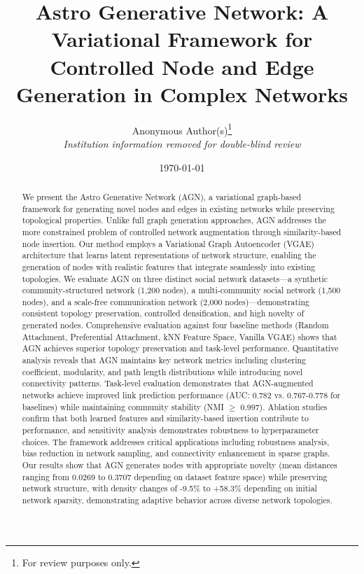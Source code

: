 \documentclass[12pt]{article}
\title{Astro Generative Network: A Variational Framework for Controlled Node and Edge Generation in Complex Networks}
\author{Anonymous Author(s)\thanks{For review purposes only.} \\
        \textit{Institution information removed for double-blind review}}
\date{\today}
\begin{document}
\maketitle

\begin{abstract}
We present the Astro Generative Network (AGN), a variational graph-based framework for generating novel nodes and edges in existing networks while preserving topological properties. Unlike full graph generation approaches, AGN addresses the more constrained problem of controlled network augmentation through similarity-based node insertion. Our method employs a Variational Graph Autoencoder (VGAE) architecture that learns latent representations of network structure, enabling the generation of nodes with realistic features that integrate seamlessly into existing topologies. We evaluate AGN on three distinct social network datasets---a synthetic community-structured network (1,200 nodes), a multi-community social network (1,500 nodes), and a scale-free communication network (2,000 nodes)---demonstrating consistent topology preservation, controlled densification, and high novelty of generated nodes. Comprehensive evaluation against four baseline methods (Random Attachment, Preferential Attachment, kNN Feature Space, Vanilla VGAE) shows that AGN achieves superior topology preservation and task-level performance. Quantitative analysis reveals that AGN maintains key network metrics including clustering coefficient, modularity, and path length distributions while introducing novel connectivity patterns. Task-level evaluation demonstrates that AGN-augmented networks achieve improved link prediction performance (AUC: 0.782 vs. 0.767-0.778 for baselines) while maintaining community stability (NMI $\geq$ 0.997). Ablation studies confirm that both learned features and similarity-based insertion contribute to performance, and sensitivity analysis demonstrates robustness to hyperparameter choices. The framework addresses critical applications including robustness analysis, bias reduction in network sampling, and connectivity enhancement in sparse graphs. Our results show that AGN generates nodes with appropriate novelty (mean distances ranging from 0.0269 to 0.3707 depending on dataset feature space) while preserving network structure, with density changes of -9.5\% to +58.3\% depending on initial network sparsity, demonstrating adaptive behavior across diverse network topologies.
\end{abstract}

\end{document}
